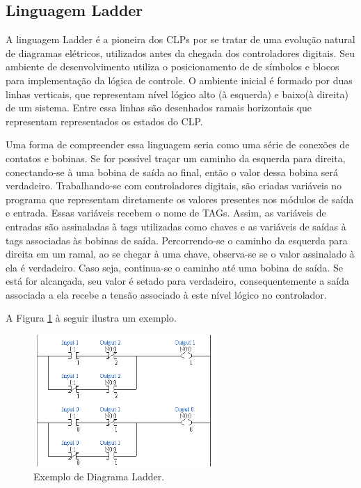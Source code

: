 \subsection{Linguagem Ladder} \label{subsec:ladder}
A linguagem Ladder é a pioneira dos CLPs por se tratar de uma evolução natural de diagramas elétricos, utilizados antes da chegada dos controladores digitais.  Seu ambiente de desenvolvimento utiliza o posicionamento de de símbolos e blocos para implementação da lógica de controle. 
O ambiente inicial é formado por duas linhas verticais, que representam nível lógico alto (à esquerda) e baixo(à direita) de um sistema. Entre essa linhas são desenhados ramais horizontais que representam representados os estados do CLP.

Uma forma de compreender essa linguagem seria como uma série de conexões de contatos e bobinas. Se for possível traçar um caminho da esquerda para direita, conectando-se à uma bobina de saída ao final, então o valor dessa bobina será verdadeiro. Trabalhando-se com controladores digitais, são criadas variáveis no programa que representam diretamente os valores presentes nos módulos de saída e entrada. Essas variáveis recebem o nome de TAGs. Assim, as variáveis de entradas são assinaladas à tags utilizadas como chaves e as variáveis de saídas à tags associadas às bobinas de saída. Percorrendo-se o caminho da esquerda para direita em um ramal, ao se chegar à uma chave, observa-se se o valor assinalado à ela é verdadeiro. Caso seja, continua-se o caminho até uma bobina de saída. Se está for alcançada, seu valor é setado para verdadeiro, consequentemente a saída associada a ela recebe a tensão associado à este nível lógico no controlador.

A Figura \ref{fig:ladder} à seguir ilustra um exemplo.

\begin{figure}[H]
	\centering
	\includegraphics[height=5cm,keepaspectratio]{figs/ladder.png}
	\caption{Exemplo de Diagrama Ladder.}
	\label{fig:ladder}
\end{figure}

